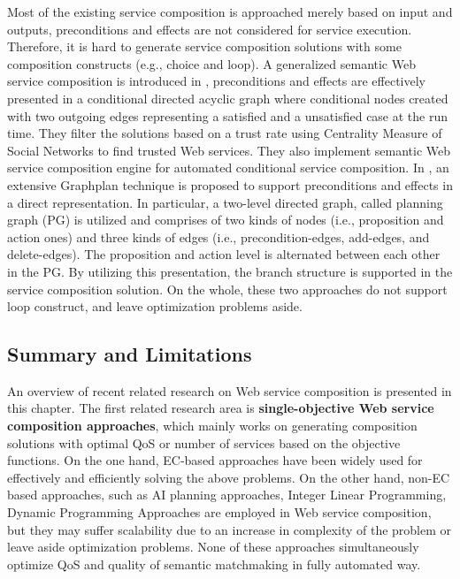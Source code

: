 Most of the existing service composition is approached merely based on input and outputs, preconditions and effects are not considered for service execution. Therefore, it is hard to generate service composition solutions with some composition constructs (e.g., choice and loop). A generalized semantic Web service composition is introduced in \cite{bansal2016generalized}, preconditions and effects are effectively presented in a conditional directed acyclic graph where conditional nodes created with two outgoing edges representing a satisfied and a unsatisfied case at the run time. They filter the solutions based on a trust rate using Centrality Measure of Social Networks to find trusted Web services. They also implement semantic Web service composition engine for automated conditional service composition. In \cite{wang2016automatic}, an extensive Graphplan technique is proposed to support preconditions and effects in a direct representation. In particular, a two-level directed graph, called planning graph (PG) is utilized and comprises of two kinds of nodes (i.e., proposition and action ones) and three kinds of edges (i.e., precondition-edges, add-edges, and delete-edges). The proposition and action level is alternated between each other in the PG. By utilizing this presentation, the branch structure is supported in the service composition solution. On the whole, these two approaches do not support loop construct, and leave optimization problems aside.


\subsection{Summary and Limitations}\label{summary}

An overview of recent related research on Web service composition is presented in this chapter. The first related research area is \textbf{single-objective Web service composition approaches}, which mainly works on generating composition solutions with optimal QoS or number of services based on the objective functions. On the one hand, EC-based approaches have been widely used for effectively and efficiently solving the above problems. On the other hand, non-EC based approaches, such as AI planning approaches, Integer Linear Programming, Dynamic Programming Approaches are employed in Web service composition, but they may suffer scalability due to an increase in complexity of the problem or leave aside optimization problems. None of these approaches simultaneously optimize QoS and quality of semantic matchmaking in fully automated way.

